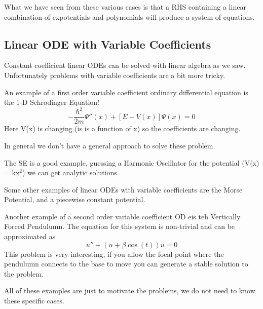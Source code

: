 \documentclass{article}
\newcommand{\be}{\begin{equation}}
\newcommand{\ee}{\end{equation}}
\begin{document}
What we have seen from these various cases is that a RHS containing a linear combination of expotentials and polynomials will produce a system of equations. 

\subsection*{Linear ODE with Variable Coefficients}
Constant coefficient linear ODEs can be solved with linear algebra as we saw.
Unfortunately problems with variable coefficients are a bit more tricky. 

An example of a first order variable coefficient ordinary differential equation is the 1-D Schrodinger Equation!
\be
-\frac{\hbar^2}{2m} \Psi''(x) + [E - V(x)] \Psi(x) = 0
\ee
Here V(x) is changing (is is a function of x) so the coefficients are changing. 

In general we don't have a general approach to solve these problem.

The SE is a  good example, guessing a Harmonic Oscillator for the potential (V(x) = kx$^2$) we can get analytic solutions. 

Some other examples of linear ODEs with variable coefficients are the Morse Potential, and a piecewise constant potential.

Another example of a second order variable coefficient OD eis teh Vertically Forced Pendulumn.
The equation for this system is non-trivial and can be approximated as
\be
u'' + (\alpha + \beta\cos(t)) u = 0
\ee
This problem is very interesting, if you allow the focal point where the pendulumn connects to the base to move you can generate a stable solution to the problem.

All of these examples are just to motivate the problems, we do not need to know these specific cases. 
\end{document}
